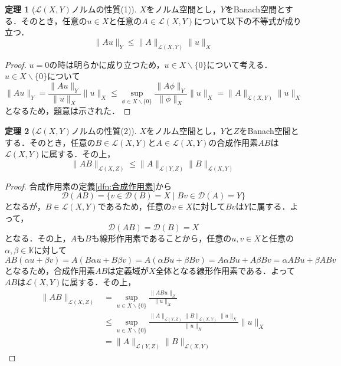 \documentclass[11pt,a4paper,titlepage]{jsreport}
\theoremstyle{definition}
\newtheorem{thm}{定理}
\begin{document}
\begin{thm}[$\mathcal{L}(X,Y)$ノルムの性質(1)]
  $X$をノルム空間とし，$Y$をBanach空間とする．そのとき，任意の$u\in X$と任意の$A\in\mathcal{L}(X,Y)$について以下の不等式が成り立つ．
  \begin{equation*}
    \|Au\|_Y\leq\|A\|_{\mathcal{L}(X,Y)}\|u\|_X
  \end{equation*}
\end{thm}

\begin{proof}
  $u=0$の時は明らかに成り立つため，$u\in X\backslash\{0\}$について考える．$u\in X\backslash\{0\}$について
  \begin{equation*}
    \|Au\|_Y = \frac{\|Au\|_Y}{\|u\|_X}\|u\|_X \leq \sup_{\phi\in X\backslash \{0\}} \frac{\|A\phi\|_Y}{\|\phi\|_X}\|u\|_X = \|A\|_{\mathcal{L}(X,Y)}\|u\|_X
  \end{equation*}
  となるため，題意は示された．
\end{proof}

\begin{thm}[$\mathcal{L}(X,Y)$ノルムの性質(2)]
  \label{thm:ノルムの性質2}
  $X$をノルム空間とし，$Y$と$Z$をBanach空間とする．そのとき，任意の$B\in\mathcal{L}(X,Y)$と$A\in\mathcal{L}(X,Y)$の合成作用素$AB$は$\mathcal{L}(X,Y)$に属する．その上，
  \begin{equation*}
    \|AB\|_{\mathcal{L}(X,Z)} \leq \|A\|_{\mathcal{L}(Y,Z)}\|B\|_{\mathcal{L}(X,Y)}
  \end{equation*}
\end{thm}

\begin{proof}
  合成作用素の定義\ref{dfn:合成作用素}から
  \begin{equation*}
    \mathcal{D}(AB)=\{v\in\mathcal{D}(B)=X \mid Bv\in\mathcal{D}(A)=Y\}
  \end{equation*}
  となるが，$B\in\mathcal{L}(X,Y)$であるため，任意の$v\in X$に対して$Bv$は$Y$に属する．よって，
  \begin{equation*}
    \mathcal{D}(AB)=\mathcal{D}(B)=X
  \end{equation*}
  となる．その上，$A$も$B$も線形作用素であることから，任意の$u,v\in X$と任意の$\alpha,\beta\in\mathbb{K}$に対して
  \begin{equation*}
    AB(\alpha u+\beta v) = A(B\alpha u+B\beta v) = A(\alpha Bu+\beta Bv) = A\alpha Bu + A\beta Bv = \alpha ABu + \beta ABv
  \end{equation*}
  となるため，合成作用素$AB$は定義域が$X$全体となる線形作用素である．よって$AB$は$\mathcal{L}(X,Y)$に属する．その上，
  \begin{align*}
    \|AB\|_{\mathcal{L}(X,Z)} & = \sup_{u\in X\backslash \{0\}} \frac{\|ABu\|_Z}{\|u\|_X}                                                            \\
                              & \leq \sup_{u\in X\backslash \{0\}} \frac{\|A\|_{\mathcal{L}(Y,Z)} \|B\|_{\mathcal{L}(X,Y)} \|u\|_X }{\|u\|_X}\|u\|_X \\
                              & = \|A\|_{\mathcal{L}(Y,Z)} \|B\|_{\mathcal{L}(X,Y)}
  \end{align*}
\end{proof}
\end{document}
